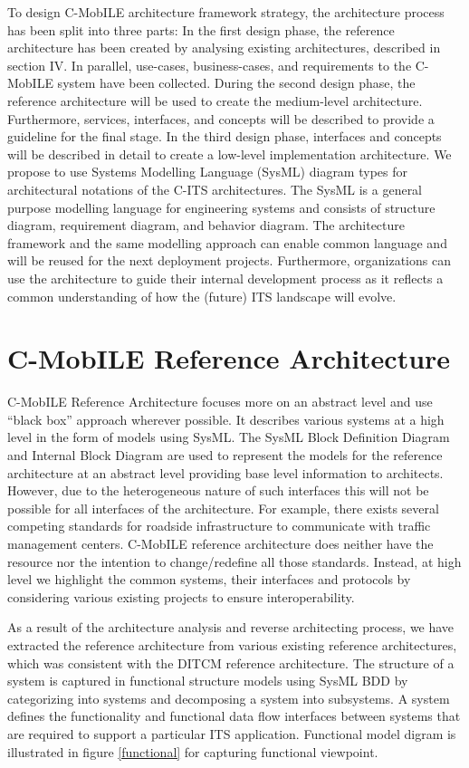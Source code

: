 \documentclass[conference]{IEEEtran}
\begin{document}
To design C-MobILE architecture framework strategy, the architecture process has been split into three parts: In the first design phase, the reference architecture has been created by analysing existing architectures, described in section IV.
In parallel, use-cases, business-cases, and requirements to the C-MobILE system have been collected.
During the second design phase, the reference architecture will be used to create the medium-level architecture.
Furthermore, services, interfaces, and concepts will be described to provide a guideline for the final stage.
In the third design phase, interfaces and concepts will be described in detail to create a low-level implementation architecture.
We propose to use Systems Modelling Language (SysML) diagram types for architectural notations of the C-ITS architectures.
The SysML is a general purpose modelling language for engineering systems and consists of structure diagram, requirement diagram, and behavior diagram.
The architecture framework and the same modelling approach can enable common language and will be reused for the next deployment projects.
Furthermore, organizations can use the architecture to guide their internal development process as it reflects a common understanding of how the (future) ITS landscape will evolve.


\section{C-MobILE Reference Architecture}

C-MobILE Reference Architecture focuses more on an abstract level and use “black box” approach wherever possible.
It describes various systems at a high level in the form of models using SysML.
The SysML Block Definition Diagram and Internal Block Diagram are used to represent the models for the reference architecture at an abstract level providing base level information to architects.
However, due to the heterogeneous nature of such interfaces this will not be possible for all interfaces of the architecture.
For example, there exists several competing standards for roadside infrastructure to communicate with traffic management centers.
C-MobILE reference architecture does neither have the resource nor the intention to change/redefine all those standards.
Instead, at high level we highlight the common systems, their interfaces and protocols by considering various existing projects to ensure interoperability.

As a result of the architecture analysis and reverse architecting process, we have extracted the reference architecture from various existing reference architectures, which was consistent with the DITCM reference architecture.
The structure of a system is captured in functional structure models using SysML BDD by categorizing into systems and decomposing a system into subsystems.
A system defines the functionality and functional data flow interfaces between systems that are required to support a particular ITS application.
Functional model digram is illustrated in figure \ref{functional} for capturing functional viewpoint.
\end{document}
